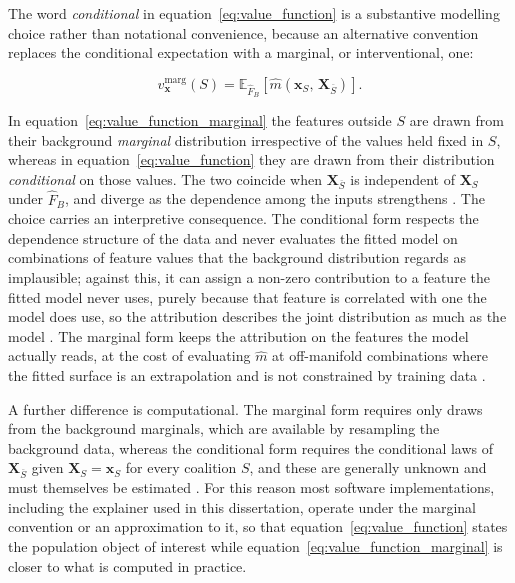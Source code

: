 The word \emph{conditional} in equation~\eqref{eq:value_function} is a
substantive modelling choice rather than notational convenience, because
an alternative convention replaces the conditional expectation with a
marginal, or interventional, one:

\begin{equation}
  \label{eq:value_function_marginal}
      v^{\mathrm{marg}}_{\mathbf{x}}(S)
      =
      \mathbb{E}_{\widehat{F}_{B}}
      \!\left[
          \widehat{m}
          \!\left(
              \mathbf{x}_{S},\,\mathbf{X}_{\overline{S}}
          \right)
      \right].
\end{equation}

In equation~\eqref{eq:value_function_marginal} the features outside \(S\)
are drawn from their background \emph{marginal} distribution irrespective
of the values held fixed in \(S\), whereas in
equation~\eqref{eq:value_function} they are drawn from their distribution
\emph{conditional} on those values. The two coincide when
\(\mathbf{X}_{\overline{S}}\) is independent of \(\mathbf{X}_{S}\) under
\(\widehat{F}_{B}\), and diverge as the dependence among the inputs
strengthens \citep{aas2021explaining, sundararajan2020many}. The choice
carries an interpretive consequence. The conditional form respects the
dependence structure of the data and never evaluates the fitted model on
combinations of feature values that the background distribution regards
as implausible; against this, it can assign a non-zero contribution to a
feature the fitted model never uses, purely because that feature is
correlated with one the model does use, so the attribution describes the
joint distribution as much as the model
\citep{janzing2020feature, covert2021explaining}. The marginal form keeps
the attribution on the features the model actually reads, at the cost of
evaluating \(\widehat{m}\) at off-manifold combinations where the fitted
surface is an extrapolation and is not constrained by training data
\citep{hooker2021unrestricted}.

A further difference is computational. The marginal form requires only
draws from the background marginals, which are available by resampling
the background data, whereas the conditional form requires the
conditional laws of \(\mathbf{X}_{\overline{S}}\) given
\(\mathbf{X}_{S}=\mathbf{x}_{S}\) for every coalition \(S\), and these are
generally unknown and must themselves be estimated
\citep{aas2021explaining}. For this reason most software implementations,
including the explainer used in this dissertation, operate under the
marginal convention or an approximation to it, so that
equation~\eqref{eq:value_function} states the population object of
interest while equation~\eqref{eq:value_function_marginal} is closer to
what is computed in practice.

